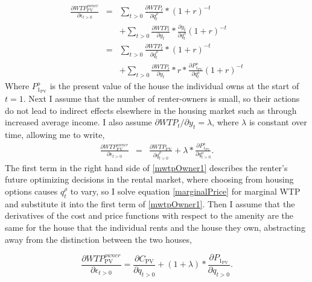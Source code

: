 \documentclass[ecta,nameyear,draft]{econsocart}
\theoremstyle{plain}
\theoremstyle{remark}
\begin{document}
\begin{eqnarray}
	\frac{\partial \mathit{WTP}^{\mathit{owner}}_{\mathrm{PV}}}{\partial \epsilon_{t>0}}&=&\sum_{t>0}\frac{\partial \mathit{WTP}_t}{\partial q^\rho_t}*(1+r)^{-t} \nonumber\\
	&& +\sum_{t>0}\frac{\partial \mathit{WTP}_t}{\partial y_t}*\frac{\partial y_t}{\partial q_t^o}(1+r)^{-t} \nonumber\\
	&=&\sum_{t>0}\frac{\partial \mathit{WTP}_t}{\partial q_t^\rho}*(1+r)^{-t}\nonumber\\
	&& +\sum_{t>0}\frac{\partial \mathit{WTP}_t}{\partial y_t}*r*\frac{\partial P^o_{1_\mathrm{PV}}}{\partial q_t^o}(1+r)^{-t} \label{mwtpOwner0}
\end{eqnarray}
Where $P^o_{1_\mathrm{PV}}$ is the present value of the house the individual owns at the start of $t=1$. Next I assume that the number of renter-owners is small, so their actions do not lead to indirect effects  elsewhere in the housing market such as through increased average income. I also assume $\partial \mathit{WTP}_t/\partial y_t=\lambda$, where $\lambda$ is constant over time, allowing me to write,
\begin{eqnarray}
	\frac{\partial \mathit{WTP}^{\mathit{owner}}_{\mathrm{PV}}}{\partial \epsilon_{t>0}} 
	&=&\frac{\partial \mathit{WTP_{\mathrm{PV}}}}{\partial q^\rho_{t>0}} + \lambda*\frac{\partial P^o_{1_\mathrm{PV}}}{\partial q_{t>0}^o} \label{mwtpOwner1}.
\end{eqnarray}
The first term in the right hand side of \ref{mwtpOwner1} describes the renter's future optimizing decisions in the rental market, where choosing from housing options causes $q_t^\rho$ to vary, so I solve equation \ref{marginalPrice} for marginal WTP and substitute it into the first term of \ref{mwtpOwner1}. Then I assume that the derivatives of the cost and price functions with respect to the amenity are the same for the house that the individual rents and the house they own, abstracting away from the distinction between the two houses, 

\begin{equation}
	\frac{\partial \mathit{WTP}^{\mathit{owner}}_{\mathrm{PV}}}{\partial \epsilon_{t>0}} =	\frac{\partial C_{\mathrm{PV}}}{\partial q_{t>0}}+(1+\lambda)*\frac{\partial P_{1_\mathrm{PV}}}{\partial q_{t>0}}.
\end{equation}
\end{document}

